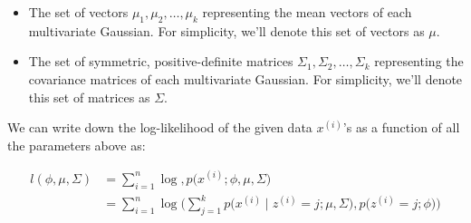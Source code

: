 \begin{definition}
\begin{itemize}
      \item The set of vectors $\mu_1, \mu_2, \ldots, \mu_k$ representing the mean vectors of each multivariate Gaussian. For simplicity, we'll denote this set of vectors as $\mu$.
      \item The set of symmetric, positive-definite matrices $\Sigma_1, \Sigma_2, \ldots, \Sigma_k$ representing the covariance matrices of each multivariate Gaussian. For simplicity, we'll denote this set of matrices as $\Sigma$.
    \end{itemize}
  \end{definition}

  We can write down the log-likelihood of the given data $x^{(i)}$'s as a function of all the parameters above as:

  \begin{align*}
    l (\phi, \mu, \Sigma) & = \sum_{i=1}^n \log, p\big( x^{(i)} ;  \phi, \mu, \Sigma \big) \\
    & = \sum_{i=1}^n \log \bigg( \sum_{j=1}^k  p\big( x^{(i)} \mid z^{(i)} = j ; \mu, \Sigma \big) , p\big( z^{(i)} = j; \phi\big) \bigg)
  \end{align*}

